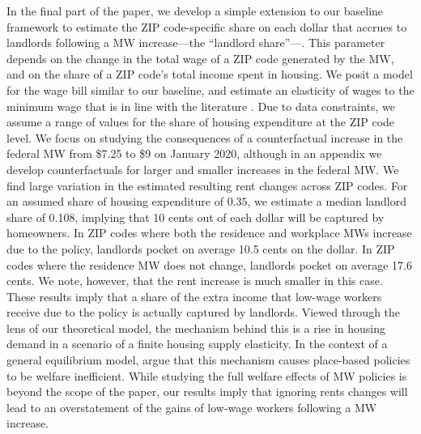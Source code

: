 
In the final part of the paper, we develop a simple extension to our baseline 
framework to estimate the ZIP code-specific share on each dollar that accrues to 
landlords following a MW increase---the ``landlord share''---.
This parameter depends on the change in the total wage of a ZIP code generated
by the MW, and on the share of a ZIP code's total income spent in housing.
We posit a model for the wage bill similar to our baseline, and estimate an 
elasticity of wages to the minimum wage that is in line with the literature
\parencite[e.g.,][]{CegnizEtAl2019}.
Due to data constraints, we assume a range of values for the share of housing
expenditure at the ZIP code level.
We focus on studying the consequences of a counterfactual increase in the federal 
MW from \$7.25 to \$9 on January 2020, although in an appendix we develop 
counterfactuals for larger and smaller increases in the federal MW.
We find large variation in the estimated resulting rent changes across ZIP codes.
For an assumed share of housing expenditure of $0.35$, we estimate a median
landlord share of 0.108, implying that 10 cents out of each dollar will be 
captured by homeowners.
In ZIP codes where both the residence and workplace MWs increase due to the 
policy, landlords pocket on average 10.5 cents on  the dollar.
In ZIP codes where the residence MW does not change, landlords pocket on average
17.6 cents.
We note, however, that the rent increase is much smaller in this case.
These results imply that a share of the extra income that low-wage workers
receive due to the policy is actually captured by landlords.
Viewed through the lens of our theoretical model,
the mechanism behind this is a rise in housing demand in a scenario of a 
finite housing supply elasticity.
In the context of a general equilibrium model, \textcite{KlineMoretti2014} argue
that this mechanism causes place-based policies to be welfare inefficient.
While studying the full welfare effects of MW policies is beyond the scope of 
the paper, our results imply that ignoring rents changes will lead to an 
overstatement of the gains of low-wage workers following a MW increase.


